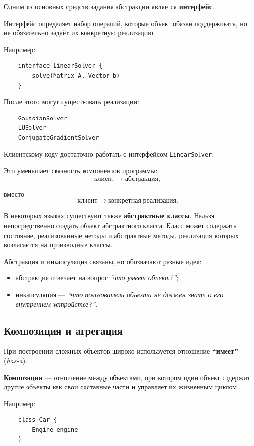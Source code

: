 Одним из основных средств задания абстракции является \textbf{интерфейс}.

Интерфейс определяет набор операций, которые объект обязан поддерживать, но не обязательно задаёт их конкретную реализацию.

Например:
\begin{verbatim}
	interface LinearSolver {
		solve(Matrix A, Vector b)
	}
\end{verbatim}

После этого могут существовать реализации:
\begin{verbatim}
	GaussianSolver
	LUSolver
	ConjugateGradientSolver
\end{verbatim}

Клиентскому коду достаточно работать с интерфейсом \texttt{LinearSolver}.

Это уменьшает связность компонентов программы:
\[
\text{клиент} \longrightarrow \text{абстракция},
\]

вместо
\[
\text{клиент} \longrightarrow
\text{конкретная реализация}.
\]

В некоторых языках существуют также \textbf{абстрактные классы}. Нельзя непосредственно создать объект абстрактного класса. Класс может содержать состояние, реализованные методы и абстрактные методы, реализация которых возлагается на производные классы.

Абстракция и инкапсуляция связаны, но обозначают разные идеи:
\begin{itemize}
	\item абстракция отвечает на вопрос \textit{``что умеет объект?''};
	\item инкапсуляция --- \textit{``что пользователь объекта не должен знать о его внутреннем устройстве?''}.
\end{itemize}

\subsection{Композиция и агрегация}

При построении сложных объектов широко используется отношение \textbf{``имеет''} (\textit{has-a}).

\textbf{Композиция} --- отношение между объектами, при котором один объект содержит другие объекты как свои составные части и управляет их жизненным циклом.

Например:
\begin{verbatim}
	class Car {
		Engine engine
	}
\end{verbatim}

